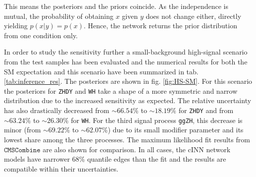 This means the posteriors and the priors coincide. As the independence is mutual, the probability of obtaining $x$ given $y$ does not change either, directly yielding $p(x|y) = p(x)$. Hence, the network returns the prior distribution from one condition only.

In order to study the sensitivity further a small-background high-signal scenario from the test samples has been evaluated and the numerical results for both the SM expectation and this scenario have been summarized in tab. \ref{tab:inference_res}. The posteriors are shown in fig. \ref{fig:HS-SM}. For this scenario the posteriors for \texttt{ZHDY} and \texttt{WH} take a shape of a more symmetric and narrow distribution due to the increased sensitivity as expected. The relative uncertainty has also drastically decreased from $\sim66.54\%$ to $\sim18.19\%$ for \texttt{ZHDY} and from $\sim63.24\%$ to $\sim26.30\%$ for \texttt{WH}. For the third signal process \texttt{ggZH}, this decrease is minor (from $\sim69.22\%$ to $\sim 62.07\%$) due to its small modifier parameter and its lowest share among the three processes. The maximum likelihood fit results from $\texttt{CMSCombine}$ are also shown for comparison. In all cases, the cINN network models have narrower 68\% quantile edges than the fit and the results are compatible within their uncertainties. 

